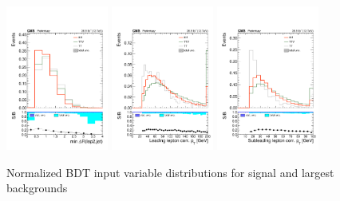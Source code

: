 \begin{figure}[htp]
\centering
\includegraphics[width=0.3\textwidth]{ch9_figs/kinMVA_input_mindr_lep2_jet.pdf}
\includegraphics[width=0.3\textwidth]{ch9_figs/kinMVA_input_LepGood0_conePt.pdf}
\includegraphics[width=0.3\textwidth]{ch9_figs/kinMVA_input_LepGood1_conePt.pdf}
\caption[Signal extraction BDT input variables]{Normalized BDT input variable distributions for signal and largest backgrounds}
\label{fig:inputs2}
\end{figure}

